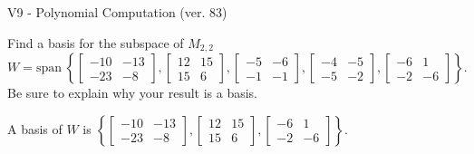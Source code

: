 \begin{exercise}
  \begin{exerciseTitle}V9 - Polynomial Computation (ver. 83)\end{exerciseTitle}
  \begin{exerciseStatement}
    Find a basis for the subspace of \(M_{2,2}\) 
\[W=\mathrm{span}\ \left\{\left[\begin{array}{cc}
-10 & -13 \\
-23 & -8
\end{array}\right] , \left[\begin{array}{cc}
12 & 15 \\
15 & 6
\end{array}\right] , \left[\begin{array}{cc}
-5 & -6 \\
-1 & -1
\end{array}\right] , \left[\begin{array}{cc}
-4 & -5 \\
-5 & -2
\end{array}\right] , \left[\begin{array}{cc}
-6 & 1 \\
-2 & -6
\end{array}\right]\right\}.\]
 Be sure to explain why your result is a basis.


  \end{exerciseStatement}
  \begin{exerciseAnswer}
   A basis of \(W\) is  \(\left\{\left[\begin{array}{cc}
-10 & -13 \\
-23 & -8
\end{array}\right] , \left[\begin{array}{cc}
12 & 15 \\
15 & 6
\end{array}\right] , \left[\begin{array}{cc}
-6 & 1 \\
-2 & -6
\end{array}\right]\right\}\).
  


  \end{exerciseAnswer}
\end{exercise}